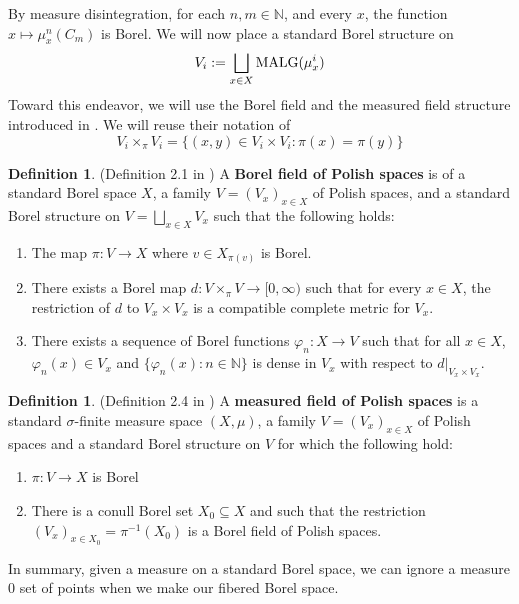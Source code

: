 \documentclass{article}
\newcommand{\malg}[1]{\textmd{MALG}(#1)}
\theoremstyle{definition}
\newtheorem{definition}[theorem]{Definition}
\begin{document}
\noindent By measure disintegration, for each $ n,m \in \mathbb{N} $, and  every $ x $, the function $ x\mapsto \mu_x^n(C_m) $ is Borel. 
\noindent We will now place a standard Borel structure on 
\[
V_i:=\bigsqcup_{x\in X} \malg{\mu_x^i} 
\]
Toward this endeavor, we will use the Borel field and the measured field structure introduced in \cite{borelfieldpaper}. We will reuse their notation of
\[
V_i\times_\pi V_i = \{(x,y)\in V_i\times V_i: \pi(x)=\pi(y) \}
\]
\begin{definition}
    (Definition 2.1 in \cite{borelfieldpaper}) A \textbf{Borel field of Polish spaces} is of a standard Borel space $ X $, a family $ V = (V_x)_{x\in X} $ of Polish spaces, and a standard Borel structure on $ V = \bigsqcup_{x\in X}V_x $ such that the following holds: \begin{enumerate}
        \item The map $\pi:V\rightarrow X $ where $ v\in X_{\pi(v)} $ is Borel.
        \item There exists a Borel map $ d:V\times_\pi V \rightarrow [0,\infty) $ such that for every $ x\in X $, the restriction of $ d $ to $ V_x\times V_x $ is a compatible complete metric for $ V_x $.
        \item There exists a sequence of Borel functions $ \varphi_n:X\rightarrow V $ such that for all $ x\in X $, $ \varphi_n(x)\in V_x $ and $ \{\varphi_n(x):n\in \mathbb{N} \} $ is dense in $ V_x $ with respect to $ d|_{V_x\times V_x} $. 
    \end{enumerate}
\end{definition}
\begin{definition}
    (Definition 2.4 in \cite{borelfieldpaper}) A \textbf{measured field of Polish spaces} is a standard $ \sigma $-finite measure space $ (X,\mu) $, a family $ V = (V_x)_{x\in X} $ of Polish spaces and a standard Borel structure on $ V $ for which the following hold:
    \begin{enumerate}
        \item $ \pi:V\rightarrow X $ is Borel
        \item There is a conull Borel set $ X_0\subseteq X $ and such that the restriction $ (V_x)_{x\in X_0} = \pi^{-1}(X_0) $ is a Borel field of Polish spaces. 
    \end{enumerate}
\end{definition}
\noindent In summary, given a measure on a standard Borel space, we can ignore a measure $ 0 $ set of points when we make our fibered Borel space.\\\\
\end{document}
